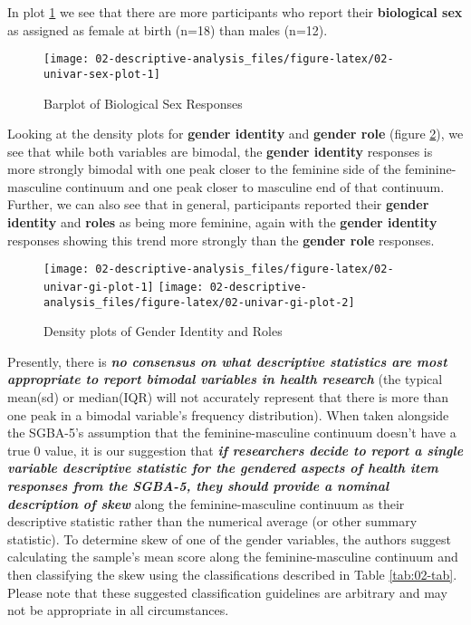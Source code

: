 \documentclass[
]{book}
\begin{document}
In plot \ref{fig:02-univar-sex-plot} we see that there are more participants who report their \textbf{biological sex} as assigned as female at birth (n=18) than males (n=12).

\begin{figure}

{\centering \texttt{[image: 02-descriptive-analysis\_files/figure-latex/02-univar-sex-plot-1]} 

}

\caption{Barplot of Biological Sex Responses}\label{fig:02-univar-sex-plot}
\end{figure}

Looking at the density plots for \textbf{gender identity} and \textbf{gender role} (figure \ref{fig:02-univar-gi-plot}), we see that while both variables are bimodal, the \textbf{gender identity} responses is more strongly bimodal with one peak closer to the feminine side of the feminine-masculine continuum and one peak closer to masculine end of that continuum. Further, we can also see that in general, participants reported their \textbf{gender identity} and \textbf{roles} as being more feminine, again with the \textbf{gender identity} responses showing this trend more strongly than the \textbf{gender role} responses.

\begin{figure}

{\centering \texttt{[image: 02-descriptive-analysis\_files/figure-latex/02-univar-gi-plot-1]} \texttt{[image: 02-descriptive-analysis\_files/figure-latex/02-univar-gi-plot-2]} 

}

\caption{Density plots of Gender Identity and Roles}\label{fig:02-univar-gi-plot}
\end{figure}

Presently, there is \emph{\textbf{no consensus on what descriptive statistics are most appropriate to report bimodal variables in health research}} (the typical mean(sd) or median(IQR) will not accurately represent that there is more than one peak in a bimodal variable's frequency distribution). When taken alongside the SGBA-5's assumption that the feminine-masculine continuum doesn't have a true 0 value, it is our suggestion that \emph{\textbf{if researchers decide to report a
single variable descriptive statistic for the gendered aspects of health item responses from the SGBA-5, they should provide a nominal description of skew}} along the feminine-masculine continuum as their descriptive statistic rather than the numerical average (or other summary statistic). To determine skew of one of the gender variables, the authors suggest calculating the sample's mean score along the feminine-masculine continuum and then classifying the skew using the classifications described in Table \ref{tab:02-tab}. Please note that these suggested classification guidelines are arbitrary and may not be appropriate in all circumstances.
\end{document}
